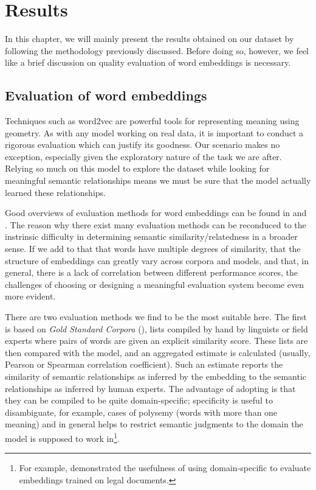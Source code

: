\chapter{Results}\label{ch:results}
In this chapter, we will mainly present the results obtained on our dataset by following the methodology previously discussed. Before doing so, however, we feel like a brief discussion on quality evaluation of word embeddings is necessary.

\section{Evaluation of word embeddings}
Techniques such as word2vec are powerful tools for representing meaning using geometry. As with any model working on real data, it is important to conduct a rigorous evaluation which can justify its goodness. Our scenario makes no exception, especially given the exploratory nature of the task we are after. Relying so much on this model to explore the dataset while looking for meaningful semantic relationships means we must be sure that the model actually learned these relationships.

Good overviews of evaluation methods for word embeddings can be found in \cite{schnabel2015evaluation} and \cite{bakarov2018survey}. The reason why there exist many evaluation methods can be reconduced to the instrinsic difficulty in determining semantic similarity/relatedness in a broader sense. If we add to that that words have multiple degrees of similarity, that the structure of embeddings can greatly vary across corpora and models, and that, in general, there is a lack of correlation between different performance scores, the challenges of choosing or designing a meaningful evaluation system become even more evident. 

There are two evaluation methods we find to be the most suitable here. The first is based on \emph{Gold Standard Corpora} (), lists compiled by hand by linguists or field experts where pairs of words are given an explicit similarity score. These lists are then compared with the model, and an aggregated estimate is calculated (usually, Pearson or Spearman correlation coefficient). Such an estimate reports the similarity of semantic relationships as inferred by the embedding to the semantic relationships as inferred by human experts. The advantage of adopting  is that they can be compiled to be quite domain-specific; specificity is useful to disambiguate, for example, cases of polysemy (words with more than one meaning) and in general helps to restrict semantic judgments to the domain the model is supposed to work in\footnote{For example, \cite{sugathadasa2017synergistic} demonstrated the usefulness of using domain-specific  to evaluate embeddings trained on legal documents.}. 

